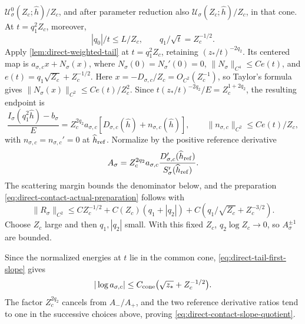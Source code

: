 \(\mathcal U_\sigma^0(Z_c;\widehat h)/Z_c\), and after parameter reduction also
\(\mathcal U_\sigma(Z_c;\widehat h)/Z_c\), in that cone. At \(t=q_1^2Z_c\),
moreover,
\[
 |q_0|/t\le L/Z_c,\qquad q_1/\sqrt t=Z_c^{-1/2}.
\]
Apply \cref{lem:direct-weighted-tail} at \(t=q_1^2Z_c\), retaining
\((z_*/t)^{-2q_2}\). Its centered map is
\(a_{\sigma,c}x+N_\sigma(x)\), where
\(N_\sigma(0)=N_\sigma'(0)=0\),
\(\|N_\sigma\|_{C^4}\le Ce(t)\), and
\(e(t)=q_1\sqrt{Z_c}+Z_c^{-1/2}\). Here
\(x=-D_{\sigma,c}/Z_c=O_{C^2}(Z_c^{-1})\), so Taylor's formula gives
\(\|N_\sigma(x)\|_{C^2}\le Ce(t)/Z_c^2\). Since
\(t(z_*/t)^{-2q_2}/E=Z_c^{1+2q_2}\), the resulting endpoint is
\[
 \frac{I_\sigma(q_1^2\widehat h)-b_\sigma}{E}
 =Z_c^{2q_2}a_{\sigma,c}
       [D_{\sigma,c}(\widehat h)+n_{\sigma,c}(\widehat h)],\qquad
 \|n_{\sigma,c}\|_{C^2}\le Ce(t)/Z_c,
\]
with \(n_{\sigma,c}=n_{\sigma,c}'=0\) at \(\widehat h_{\rm ref}\).
Normalize by the positive reference derivative
\[
 A_\sigma=Z_c^{2q_2}a_{\sigma,c}
 \frac{D_{\sigma,c}'(\widehat h_{\rm ref})}
      {S_\sigma'(\widehat h_{\rm ref})}.
\]
The scattering margin bounds the denominator below, and the preparation
\eqref{eq:direct-contact-actual-preparation} follows with
\[
 \|R_\sigma\|_{C^2}
 \le CZ_c^{-1/2}+C(Z_c)(q_1+|q_2|)
           +C(q_1/\sqrt{Z_c}+Z_c^{-3/2}).
\]
Choose \(Z_c\) large and then \(q_1,|q_2|\) small. With this fixed
\(Z_c\), \(q_2\log Z_c\to0\), so \(A_\sigma^{\pm1}\) are bounded.

Since the normalized energies at \(t\) lie in the common cone,
\eqref{eq:direct-tail-first-slope} gives
\[
 |\log a_{\sigma,c}|\le C_{\rm cone}\bigl(\sqrt{z_*}+Z_c^{-1/2}\bigr).
\]
The factor \(Z_c^{2q_2}\) cancels from \(A_-/A_+\), and
the two reference derivative ratios tend to one in the
successive choices above, proving \eqref{eq:direct-contact-slope-quotient}.

